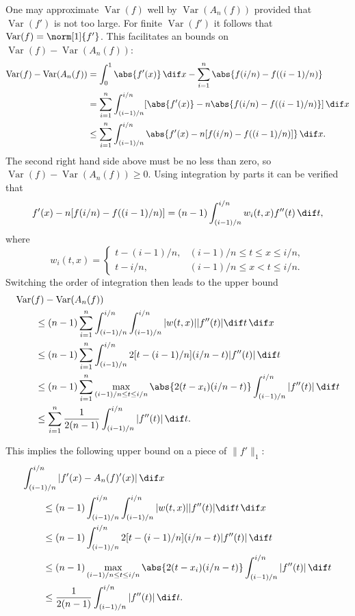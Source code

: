 \documentclass[]{amsart}
\DeclareMathOperator{\Var}{Var}
\theoremstyle{definition}
\theoremstyle{remark}
\begin{document}
One may approximate $\Var(f)$ well by $\Var(A_n(f))$ provided that $\Var(f')$ is not too large.  For finite $\Var(f')$ it follows that $\Var(f) = \norm[1]{f'}$.  This facilitates an bounds on $\Var(f) - \Var(A_n(f))$:
\begin{align*}
\Var(f) - \Var(A_n(f)) 
& = \int_0^1 \abs{f'(x)} \, \dif x - \sum_{i=1}^{n} \abs{f(i/n) - f((i-1)/n)}\\
& = \sum_{i=1}^{n} \int_{(i-1)/n}^{i/n} [\abs{f'(x)} - n \abs{f(i/n) - f((i-1)/n)}] \, \dif x \\
& \le \sum_{i=1}^{n} \int_{(i-1)/n}^{i/n} \abs{f'(x) - n [f(i/n) - f((i-1)/n)]} \, \dif x. \end{align*}
The second right hand side above must be no less than zero, so $\Var(f) - \Var(A_n(f)) \ge 0$.  Using integration by parts it can be verified that 
\begin{equation*}
f'(x) - n [f(i/n) - f((i-1)/n)]  = (n-1) \int_{(i-1)/n}^{i/n} w_i(t,x) f''(t) \, \dif t,
\end{equation*}
where 
\[
w_i(t,x) = \begin{cases}  t-(i-1)/n, & (i-1)/n \leq t\leq x \le i/n,\\
t-i/n, & (i-1)/n \leq x< t \leq i/n.
\end{cases}
\]
Switching the order of integration then leads to the upper bound 
\begin{align*}
\MoveEqLeft{\Var(f) - \Var(A_n(f))}\\
& \le (n-1) \sum_{i=1}^{n} \int_{(i-1)/n}^{i/n} \int_{(i-1)/n}^{i/n}|w(t,x)||f''(t)| \dif t \, \dif x\\
& \le  (n-1) \sum_{i=1}^{n} \int_{(i-1)/n}^{i/n}2[t-(i-1)/n](i/n-t)|f''(t)| \, \dif t \\
& \le  (n-1) \sum_{i=1}^{n}  \max_{(i-1)/n \le t \le i/n} \abs{2(t-x_i)(i/n-t)} \int_{(i-1)/n}^{i/n} |f''(t)| \, \dif t \\
&  \le \sum_{i=1}^{n}  \frac{1}{2(n-1)}\int_{(i-1)/n}^{i/n} |f''(t)| \, \dif t .
\end{align*}

This implies the following upper bound on a piece of $\|f'\|_{1}$:
\begin{align*}
\MoveEqLeft{\int_{(i-1)/n}^{i/n}|f'(x)-A_n(f)'(x)| \, \dif x}\\
& \le (n-1) \int_{(i-1)/n}^{i/n} \int_{(i-1)/n}^{i/n}|w(t,x)||f''(t)| \dif t \, \dif x\\
& \le  (n-1)\int_{(i-1)/n}^{i/n}2[t-(i-1)/n](i/n-t)|f''(t)| \, \dif t \\
& \le  (n-1) \max_{(i-1)/n \le t \le i/n} \abs{2(t-x_i)(i/n-t)} \int_{(i-1)/n}^{i/n} |f''(t)| \, \dif t \\
&  \le \frac{1}{2(n-1)}\int_{(i-1)/n}^{i/n} |f''(t)| \, \dif t .
\end{align*}
\end{document}
